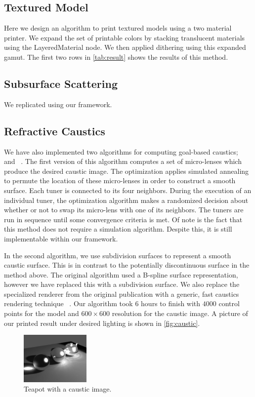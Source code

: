 \documentclass[annual]{acmsiggraph}
\begin{document}
\subsection{Textured Model}
Here we design an algorithm to print textured models using a two material printer. We expand the set of printable colors by stacking translucent materials using the LayeredMaterial node. We then applied dithering using this expanded gamut. 
The first two rows in \autoref{tab:result} shows the results of this method.
\subsection{Subsurface Scattering}
We replicated \cite{Hasan:2010} using our framework. 

\subsection{Refractive Caustics}
We have also implemented two algorithms for computing goal-based caustics;  ~\cite{Marios:2011} and ~\cite{Finckh:2010}.
The first version of this algorithm computes  a set of micro-lenses which produce the desired caustic image. 
The optimization applies simulated annealing to permute the location of these micro-lenses in order to construct a smooth surface.
Each tuner is connected to its four neighbors.
During the execution of an individual tuner, the optimization algorithm makes a randomized decision about
 whether or not to swap its micro-lens with one of its neighbors.
The tuners are run in sequence until some convergence criteria is met.
Of note is the fact that this method does not require a simulation algorithm. 
Despite this, it is still implementable within our framework. 

In the second algorithm, we use subdivision surfaces to represent a smooth caustic surface. 
This is in contrast to the potentially discontinuous surface in the method above. 
The original algorithm used a B-spline surface representation, however we have replaced this with a subdivision surface. 
We also replace the specialized renderer from the original publication with a generic, fast caustics rendering technique ~\cite{Yuksel:2009}. Our algorithm took 6 hours to finish with $4000$ control points for the model and $600\times 600$ resolution for the caustic image.  A picture of our printed result under desired lighting is shown in \autoref{fig:caustic}.
\begin{figure}
	\centering
 	\includegraphics[width=0.3\textwidth]{figure/caustic.jpg}
\caption{Teapot with a caustic image.}
\label{fig:caustic}
\end{figure}
\end{document}
